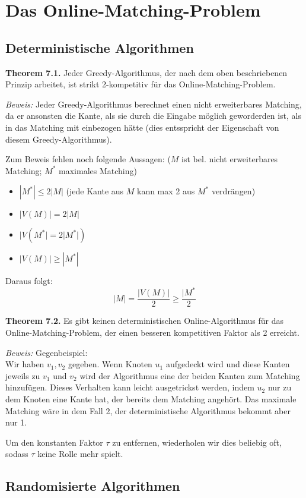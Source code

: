 {\chapter{Das Online-Matching-Problem}

\section{Deterministische Algorithmen}

\textbf{Theorem 7.1.} Jeder Greedy-Algorithmus, der nach dem oben beschriebenen Prinzip arbeitet, ist strikt 2-kompetitiv für das Online-Matching-Problem.

\textit{Beweis:} Jeder Greedy-Algorithmus berechnet einen nicht erweiterbares Matching, da er ansonsten die Kante, als sie durch die Eingabe möglich geworderden ist, als in das Matching mit einbezogen hätte (dies entsspricht der Eigenschaft von diesem Greedy-Algorithmus).

Zum Beweis fehlen noch folgende Aussagen: ($M$ ist bel. nicht erweiterbares Matching; $M^{*}$ maximales Matching)
\begin{itemize}
\item $|M^{*}| \le 2|M|$ (jede Kante aus $M$ kann max 2 aus $M^{*}$ verdrängen)
\item $|V(M)| = 2|M|$
\item $|V(M^{*}| = 2|M^{*}|)$
\item $|V(M)| \ge |M^{*}|$
\end{itemize}
Daraus folgt: $$|M| = \frac{|V(M)|}{2} \ge \frac{|M^{*}}{2}$$

\textbf{Theorem 7.2.} Es gibt keinen deterministischen Online-Algorithmus für das Online-Matching-Problem, der einen besseren kompetitiven Faktor als 2 erreicht.

\textit{Beweis:} Gegenbeispiel:\\
Wir haben $v_{1}, v_{2}$ gegeben. Wenn Knoten $u_{1}$ aufgedeckt wird und diese Kanten jeweils zu $v_{1}$ und $v_{2}$ wird der Algorithmus eine der beiden Kanten zum Matching hinzufügen. Dieses Verhalten kann leicht ausgetrickst werden, indem $u_{2}$ nur zu dem Knoten eine Kante hat, der bereits dem Matching angehört. Das maximale Matching wäre in dem Fall 2, der deterministische Algorithmus bekommt aber nur 1.

Um den konstanten Faktor $\tau$ zu entfernen, wiederholen wir dies beliebig oft, sodass $\tau$ keine Rolle mehr spielt.

\section{Randomisierte Algorithmen}

}
